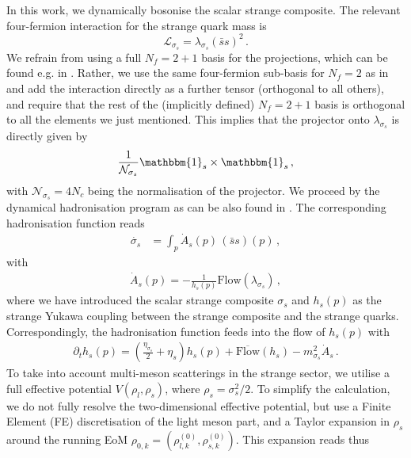 \documentclass[10pt,prd,superscriptaddress,twocolumn]{revtex4-2}
\begin{document}
In this work, we dynamically bosonise the scalar strange composite.
The relevant four-fermion interaction for the strange quark mass is
%
\begin{equation}\label{eq:QCDPD_scalarStrange4F}
	\mathcal{L}_{\sigma_s} = \lambda_{\sigma_s} (\bar{s}s)^2
	\,.
\end{equation}
%
We refrain from using a full $N_f=2+1$ basis for the projections, which can be found e.g. in \cite{Braun:2020mhk}. Rather, we use the same four-fermion sub-basis for $N_f=2$ as in \cite{Ihssen:2024miv} and add the interaction  directly as a further tensor (orthogonal to all others), and require that the rest of the (implicitly defined) $N_f=2+1$ basis is orthogonal to all the elements we just mentioned.
This implies that the projector onto $\lambda_{\sigma_s}$ is directly given by 
%
\begin{equation}
	\frac{1}{\mathcal{N}_{\sigma_s}}\mathbbm{1}_s\times \mathbbm{1}_s
	\,,
\end{equation}
%
with $\mathcal{N}_{\sigma_s} = 4N_c$ being the normalisation of the projector.
We proceed by the dynamical hadronisation program as can be also found in  \cite{Fu:2019hdw, Ihssen:2024miv}. The corresponding hadronisation function reads
%
\begin{align}
	\dot{\sigma_s} &= \int_p\dot{A}_s(p)\,(\bar{s}s)(p)
	\,,
\end{align}
%
with
%
\begin{align}
	\dot{A}_s(p) = -\frac{1}{h_s(p)}\text{Flow}(\lambda_{\sigma_s})
	\,,
\end{align}
%
where we have introduced the scalar strange composite $\sigma_s$ and $h_s(p)$ as the strange Yukawa coupling between the strange composite and the strange quarks.
Correspondingly, the hadronisation function feeds into the flow of $h_s(p)$ with
%
\begin{align}
	\partial_t h_s(p) = \left(\frac{\eta_{\sigma_s}}{2} + \eta_s\right)h_s(p) + \overline{\text{Flow}}(h_s) - m_{\sigma_s}^2 \dot{A}_s
	\,.
\end{align}
%
To take into account multi-meson scatterings in the strange sector, we utilise a full effective potential $V(\rho_l, \rho_s)$, where $\rho_s = \sigma_s^2 / 2$. To simplify the calculation, we do not fully resolve the two-dimensional effective potential, but use a Finite Element (FE) discretisation of the light meson part, and a Taylor expansion in $\rho_s$ around the running {EoM} ${\rho_{0,k} = (\rho^{(0)}_{l,k}, \rho^{(0)}_{s,k})}$. This expansion reads thus
\end{document}
